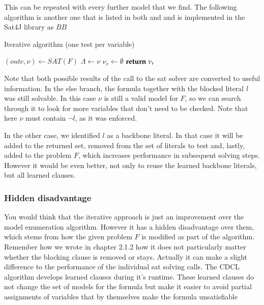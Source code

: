 This can be repeated with every further model that we find. The following algorithm is another one that is listed in both \cite{mjl10} and \cite{mjl15} and is implemented in the Sat4J library as $BB$

\begin{algorithm}
\caption{{\sc Iterative algorithm (one test per variable)}}
\DontPrintSemicolon
{}

$(outc,\nu) \gets SAT(F)$\;
$\Lambda \gets \nu$\;
$\nu_r \gets \emptyset$\;
$\Return \; \nu_r$\;
\end{algorithm}

Note that both possible results of the call to the sat solver are converted to useful information. In the else branch, the formula together with the blocked literal $l$ was still solvable. In this case $\nu$ is still a valid model for $F$, so we can search through it to look for more variables that don't need to be checked. Note that here $\nu$ must contain $\neg l$, as it was enforced.

In the other case, we identified $l$ as a backbone literal. In that case it will be added to the returned set, removed from the set of literals to test and, lastly, added to the problem $F$, which increases performance in subsequent solving steps. However it would be even better, not only to reuse the learned backbone literals, but all learned clauses.

\subsubsection{Hidden disadvantage}

You would think that the iterative approach is just an improvement over the model enumeration algorithm. However it has a hidden disadvantage over them, which stems from how the given problem $F$ is modified as part of the algorithm. Remember how we wrote in chapter 2.1.2 how it does not particularly matter whether the blocking clause is removed or stays. Actually it can make a slight difference to the performance of the individual sat solving calls. The CDCL algorithm develops learned clauses during it's runtime. These learned clauses do not change the set of models for the formula but make it easier to avoid partial assignments of variables that by themselves make the formula unsatisfiable 

